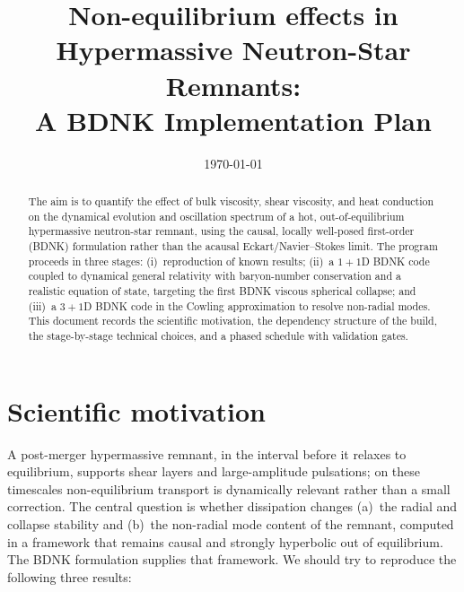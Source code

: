 \documentclass[11pt]{article}
\title{Non-equilibrium effects in Hypermassive Neutron-Star Remnants:\\[2pt]
A BDNK Implementation Plan}
\author{}
\date{\today}
\begin{document}
\maketitle

\begin{abstract}
The aim is to quantify the effect of bulk viscosity, shear viscosity, and heat
conduction on the dynamical evolution and oscillation spectrum of a hot,
out-of-equilibrium hypermassive neutron-star remnant, using the causal, locally
well-posed first-order (BDNK) formulation rather than the acausal
Eckart/Navier--Stokes limit. The program proceeds in three stages:
(i)~reproduction of known results;
(ii)~a $1{+}1$D BDNK code coupled to dynamical general relativity with
baryon-number conservation and a realistic equation of state, targeting the
first BDNK viscous spherical collapse; and (iii)~a $3{+}1$D BDNK code in the
Cowling approximation to resolve non-radial modes. This document records the
scientific motivation, the dependency structure of the build, the
stage-by-stage technical choices, and a phased schedule with validation gates.
\end{abstract}

\section{Scientific motivation}
A post-merger hypermassive remnant, in the interval before it relaxes to
equilibrium, supports shear layers and large-amplitude pulsations; on these
timescales non-equilibrium transport is dynamically relevant rather than a small
correction. The central question is whether dissipation changes (a)~the radial
and collapse stability and (b)~the non-radial mode content of the remnant,
computed in a framework that remains causal and strongly hyperbolic out of
equilibrium. The BDNK formulation supplies that framework. We should try to reproduce the following three results:
\end{document}
